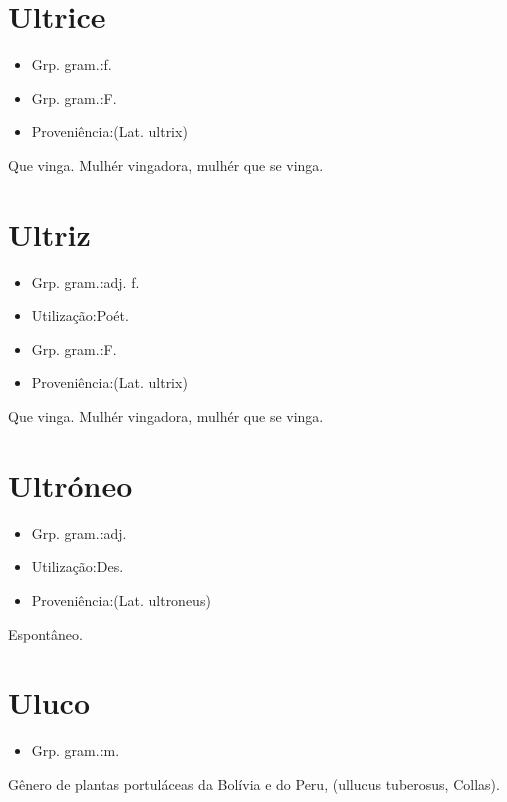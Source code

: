\documentclass{article}
\begin{document}
\section{Ultrice}
\begin{itemize}
\item {Grp. gram.:f.}
\end{itemize}
\begin{itemize}
\item {Grp. gram.:F.}
\end{itemize}
\begin{itemize}
\item {Proveniência:(Lat. \textunderscore ultrix\textunderscore )}
\end{itemize}
Que vinga.
Mulhér vingadora, mulhér que se vinga.
\section{Ultriz}
\begin{itemize}
\item {Grp. gram.:adj. f.}
\end{itemize}
\begin{itemize}
\item {Utilização:Poét.}
\end{itemize}
\begin{itemize}
\item {Grp. gram.:F.}
\end{itemize}
\begin{itemize}
\item {Proveniência:(Lat. \textunderscore ultrix\textunderscore )}
\end{itemize}
Que vinga.
Mulhér vingadora, mulhér que se vinga.
\section{Ultróneo}
\begin{itemize}
\item {Grp. gram.:adj.}
\end{itemize}
\begin{itemize}
\item {Utilização:Des.}
\end{itemize}
\begin{itemize}
\item {Proveniência:(Lat. \textunderscore ultroneus\textunderscore )}
\end{itemize}
Espontâneo.
\section{Uluco}
\begin{itemize}
\item {Grp. gram.:m.}
\end{itemize}
Gênero de plantas portuláceas da Bolívia e do Peru, (\textunderscore ullucus tuberosus\textunderscore , Collas).
\end{document}
